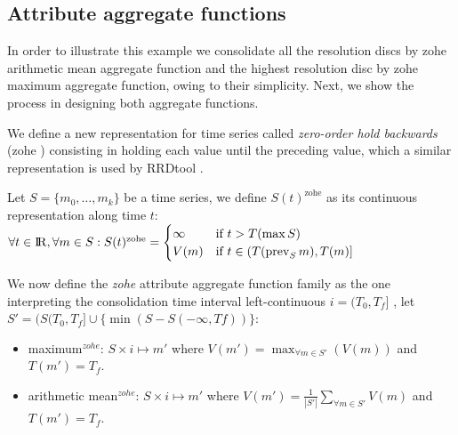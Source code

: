 \subsection{Attribute aggregate functions}

In order to illustrate this example we consolidate all the resolution
discs by zohe arithmetic mean aggregate function and the highest
resolution disc by zohe maximum aggregate function, owing to their
simplicity. Next, we show the process in designing both aggregate
functions.


We define a new
representation for time series called \emph{zero-order hold backwards}
(zohe%
) consisting in holding each value until the preceding value, which a
similar representation is used by RRDtool \cite{lisa98:oetiker}.

Let $S=\{m_0,\ldots,m_k\}$ be a time series, we define
$S(t)^{\text{zohe}}$ as its continuous representation along time $t$:
$
\forall t \in \mathbb{R}  ,\forall m \in S:
S(t)^{\text{zohe}} =  
\begin{cases}
  \infty & \text{if } t > T(\max S) \\%
  V(m) & \text{if }  t\in (T(\prev_S m),T(m)]
\end{cases}
$


We now define the \emph{zohe} attribute
aggregate function family as the one interpreting the
consolidation time interval left-continuous $i=(T_0,T_f]$
%
, let $S'=(S(T_0,T_f] \cup \{\min(S-S(-\infty,Tf))\}$:
%
\begin{itemize}
\item maximum$^{zohe}$: $S \times i \mapsto m'$ where $V(m') =
  \max_{\forall m \in S'}(V(m))$ and $T(m')=T_f$.
\item arithmetic mean$^{zohe}$: $S \times i \mapsto m'$ where $V(m')
  = \frac{1}{|S'|} \sum\limits_{\forall m\in S'} V(m)$ and
  $T(m')=T_f$. 
\end{itemize}







